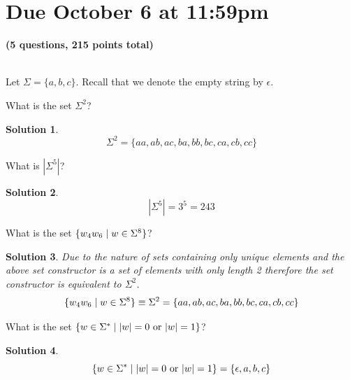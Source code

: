 \documentclass[11pt]{article}
\newtheorem*{solution}{Solution}
\begin{document}
\maketitle

\section*{Due October 6 at 11:59pm}

\textbf{(5 questions, 215 points total)}

\begin{qunlist}
  \\
  Let $\Sigma = \{ a, b, c \}$.
  Recall that we denote the empty string by $\epsilon$.
  \begin{qparts}
    \item
    What is the set $\Sigma^2$?
    \begin{solution}
      \begin{equation}
        \Sigma^2 = \{aa,ab,ac,ba,bb,bc,ca,cb,cc \}
      \end{equation}
    \end{solution}

    \item
    What is $|\Sigma^5|$?
    \begin{solution}
      \begin{equation}
        |\Sigma^5| = 3^5 = 243
      \end{equation}
    \end{solution}

    \item
    What is the set $\{ w_4 w_6 \;|\; w \in \Sigma^{8} \}$?
    \begin{solution}
      Due to the nature of sets containing only unique elements and the above set constructor is a set of elements with only length 2 therefore the set constructor is equivalent to $\Sigma^2$.
      \begin{equation}
        \{ w_4 w_6 \;|\; w \in \Sigma^{8} \} \equiv \Sigma^2 = \{aa,ab,ac,ba,bb,bc,ca,cb,cc \}
      \end{equation}
    \end{solution}

    \item
    What is the set $\{ w \in \Sigma^* \;|\; |w| = 0 \text{ or } |w| = 1 \}$?
    \begin{solution}
      \begin{equation}
        \{ w \in \Sigma^* \;|\; |w| = 0 \text{ or } |w| = 1 \} = \{\epsilon,a,b,c\}
      \end{equation}
    \end{solution}


\end{qparts}
\end{qunlist}
\end{document}
